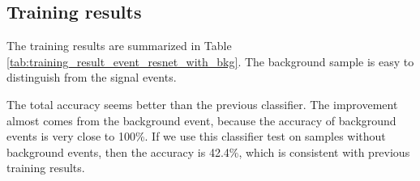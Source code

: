 \documentclass[12pt]{article}
\begin{document}
	\subsection{Training results}%
	\label{sub:full_event_training_results_with_background}
		The training results are summarized in Table \ref{tab:training_result_event_resnet_with_bkg}. The background sample is easy to distinguish from the signal events.
		\begin{table}[htpb]
			\centering
			\caption{The training results with the background samples. The average and standard deviation of 10 training are presented.}
			\label{tab:training_result_event_resnet_with_bkg}
		\end{table}

		The total accuracy seems better than the previous classifier. The improvement almost comes from the background event, because the accuracy of background events is very close to 100\%. If we use this classifier test on samples without background events, then the accuracy is 42.4\%, which is consistent with previous training results.



\end{document}
